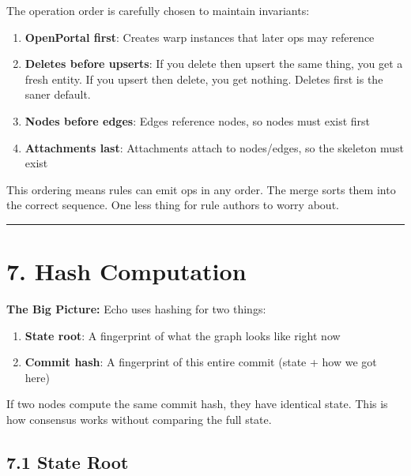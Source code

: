 \documentclass[11pt]{book}
\newenvironment{directors}
{\begin{mdframed}[
  linecolor=blue!60,
  linewidth=2pt,
  leftline=true,
  rightline=false,
  topline=false,
  bottomline=false,
  backgroundcolor=blue!3,
  innerleftmargin=12pt,
  innerrightmargin=10pt,
  innertopmargin=8pt,
  innerbottommargin=8pt,
  skipabove=12pt,
  skipbelow=12pt
]\small\sffamily\color{blue!70!black}}
{\end{mdframed}}
\newenvironment{bigpicture}
{\begin{mdframed}[
  linecolor=purple!60,
  linewidth=2pt,
  leftline=true,
  rightline=false,
  topline=false,
  bottomline=false,
  backgroundcolor=purple!3,
  innerleftmargin=12pt,
  innerrightmargin=10pt,
  innertopmargin=8pt,
  innerbottommargin=8pt,
  skipabove=12pt,
  skipbelow=12pt
]\small\sffamily\color{purple!70!black}\textbf{The Big Picture:} }
{\end{mdframed}}
\begin{document}
\begin{directors}
The operation order is carefully chosen to maintain invariants:

\begin{enumerate}
\item \textbf{OpenPortal first}: Creates warp instances that later ops may reference
\item \textbf{Deletes before upserts}: If you delete then upsert the same thing, you get a fresh entity. If you upsert then delete, you get nothing. Deletes first is the saner default.
\item \textbf{Nodes before edges}: Edges reference nodes, so nodes must exist first
\item \textbf{Attachments last}: Attachments attach to nodes/edges, so the skeleton must exist
\end{enumerate}

This ordering means rules can emit ops in any order. The merge sorts them into the correct sequence. One less thing for rule authors to worry about.
\end{directors}

\begin{center}\rule{0.5\linewidth}{0.5pt}\end{center}

\section{7. Hash Computation}\label{hash-computation}

\begin{bigpicture}
Echo uses hashing for two things:

\begin{enumerate}
\item \textbf{State root}: A fingerprint of what the graph looks like right now
\item \textbf{Commit hash}: A fingerprint of this entire commit (state + how we got here)
\end{enumerate}

If two nodes compute the same commit hash, they have identical state. This is how consensus works without comparing the full state.
\end{bigpicture}

\subsection{7.1 State Root}
\end{document}

